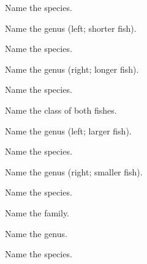 \documentclass{exam}
\begin{document}
\begin{questions}
{\question 
Name the species.
\vspace{2\baselineskip}

\question 
Name the genus (left; shorter fish).
\vspace{0.5\baselineskip}

\question 
Name the species.
\vspace{0.5\baselineskip}

\question 
Name the genus (right; longer fish).
\vspace{0.5\baselineskip}

\question 
Name the species.
\vspace{0.5\baselineskip}

\question 
Name the class of both fishes.
\vspace{2\baselineskip}

\question 
Name the genus (left; larger fish).
\vspace{0.5\baselineskip}

\question 
Name the species.
\vspace{0.5\baselineskip}

\question 
Name the genus (right; smaller fish).
\vspace{0.5\baselineskip}

\question 
Name the species.
\vspace{2\baselineskip}

\question 
Name the family.
\vspace{0.5\baselineskip}

\question 
Name the genus.
\vspace{0.5\baselineskip}

\question 
Name the species.
\vspace{2\baselineskip}

%
}%
\end{questions}
\end{document}
